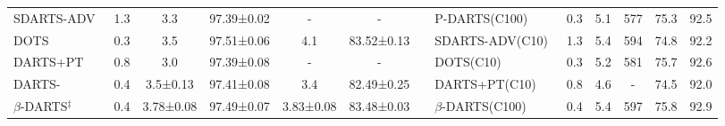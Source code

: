\documentclass[10pt,twocolumn,letterpaper]{article}
\begin{document}
\begin{table*}[t]
\begin{center}
{\begin{tabular}{lcccccllccccc}
SDARTS-ADV~\cite{sdarts}              & 1.3                                                                   & 3.3          & 97.39±0.02    & -             & -             &  & P-DARTS(C100)~\cite{pdarts}                       & 0.3                                                                   & 5.1                                                                   & 577                                                                  & 75.3                                                                 & 92.5                                                                 \\
DOTS~\cite{dots}                    & 0.3                                                                   & 3.5          & 97.51±0.06    & 4.1           & 83.52±0.13    &  & SDARTS-ADV(C10)~\cite{sdarts}                     & 1.3                                                                   & 5.4                                                                   & 594                                                                  & 74.8                                                                 & 92.2                                                                 \\
DARTS+PT~\cite{darts+pt}                & 0.8                                                                   & 3.0          & 97.39±0.08    & -             & -             &  & DOTS(C10)~\cite{dots}                           & 0.3                                                                   & 5.2                                                                   & 581                                                                  & 75.7                                                                 & 92.6                                                                 \\
DARTS-~\cite{darts-}                  & 0.4                                                                   & 3.5±0.13     & 97.41±0.08    & 3.4           & 82.49±0.25    &  & DARTS+PT(C10)~\cite{darts+pt}                       & 0.8                                                                   & 4.6                                                                   & -                                                                    & 74.5                                                                 & 92.0                                                                 \\
$\beta$-DARTS$^\ddagger$         & 0.4                                                                   & 3.78±0.08    & 97.49±0.07    & 3.83±0.08     & 83.48±0.03    &  & $\beta$-DARTS(C100)                     & 0.4                                                  & 5.4                                                  & 597                                                 & 75.8                                                 & 92.9                                                 \\

\end{tabular}}
\end{center}
\end{table*}
\end{document}
